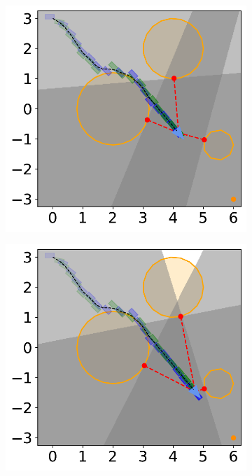 \begin{figure}[H]
    \begin{subfigure}{0.35\textwidth}
        \centering
        \includegraphics[width=\textwidth]{figures/Simulations/sim1circles/frame_6.pdf}
    \end{subfigure}%
    \hfil
    \begin{subfigure}{0.35\textwidth}
        \centering
        \includegraphics[width=\textwidth]{figures/Simulations/sim1circles/frame_7.pdf}
    \end{subfigure}%


\end{figure}
